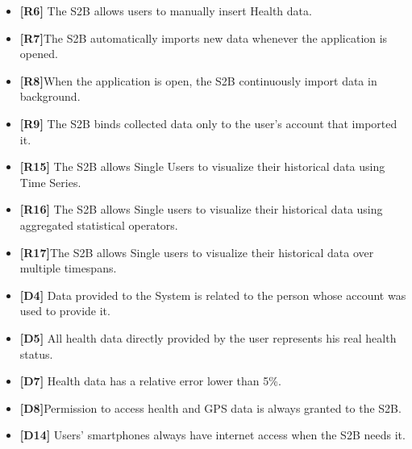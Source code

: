 \documentclass[titlepage]{article}
\begin{document}
\begin{itemize}
					 \begin{itemize} %
					 	\item {\bf [R6]} The S2B allows users to manually insert Health data.
\item {\bf [R7]}The S2B automatically imports new data whenever the application is opened.
\item {\bf [R8]}When the application is open, the S2B continuously import data in background.
\item {\bf [R9]} The S2B binds collected data only to the user’s account that imported it. 
\item {\bf [R15]} The S2B allows Single Users to visualize their historical data using Time Series. 
\item {\bf [R16]} The S2B allows Single users to visualize their historical data using aggregated statistical operators. 
\item {\bf [R17]}The S2B allows Single users to visualize their historical data over multiple timespans.
\item {\bf [D4]} Data provided to the System is related to the person whose account was used to provide it.
\item {\bf [D5]} All health data directly provided by the user represents his real health status.
\item {\bf [D7]} Health data has a relative error lower than 5\%.
\item {\bf [D8]}Permission to access health and GPS data is always granted to the S2B. 
\item {\bf [D14]} Users’ smartphones always have internet access when the S2B needs it.


\end{itemize}
\end{itemize}
\end{document}
